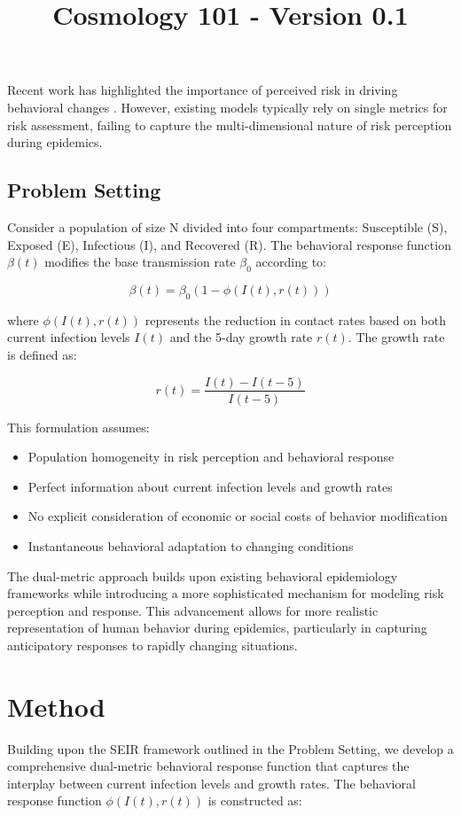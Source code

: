 \documentclass{article}\usepackage{graphicx} \usepackage{amsmath} \usepackage{colortbl}\title{Cosmology 101 - Version 0.1}
\begin{document}
Recent work has highlighted the importance of perceived risk in driving behavioral changes \cite{wang2020impact}. However, existing models typically rely on single metrics for risk assessment, failing to capture the multi-dimensional nature of risk perception during epidemics.

\subsection{Problem Setting}
Consider a population of size N divided into four compartments: Susceptible (S), Exposed (E), Infectious (I), and Recovered (R). The behavioral response function $\beta(t)$ modifies the base transmission rate $\beta_0$ according to:

\begin{equation}
\beta(t) = \beta_0(1 - \phi(I(t), r(t)))
\end{equation}

where $\phi(I(t), r(t))$ represents the reduction in contact rates based on both current infection levels $I(t)$ and the 5-day growth rate $r(t)$. The growth rate is defined as:

\begin{equation}
r(t) = \frac{I(t) - I(t-5)}{I(t-5)}
\end{equation}

This formulation assumes:
\begin{itemize}
\item Population homogeneity in risk perception and behavioral response
\item Perfect information about current infection levels and growth rates
\item No explicit consideration of economic or social costs of behavior modification
\item Instantaneous behavioral adaptation to changing conditions
\end{itemize}

The dual-metric approach builds upon existing behavioral epidemiology frameworks while introducing a more sophisticated mechanism for modeling risk perception and response. This advancement allows for more realistic representation of human behavior during epidemics, particularly in capturing anticipatory responses to rapidly changing situations.\section{Method}
Building upon the SEIR framework outlined in the Problem Setting, we develop a comprehensive dual-metric behavioral response function that captures the interplay between current infection levels and growth rates. The behavioral response function $\phi(I(t), r(t))$ is constructed as:
\end{document}
